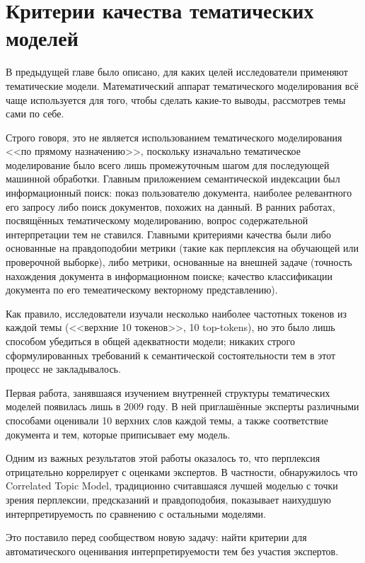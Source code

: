\chapter{Критерии качества тематических моделей}
\label{chap:metrics}


В предыдущей главе было описано, для каких целей исследователи применяют тематические модели. Математический аппарат тематического моделирования всё чаще используется для того, чтобы сделать какие-то выводы, рассмотрев темы сами по себе.

Строго говоря, это не является использованием тематического моделирования <<по прямому назначению>>, поскольку изначально тематическое моделирование было всего лишь промежуточным шагом для последующей машинной обработки. Главным приложением семантической индексации был информационный поиск: показ пользователю документа, наиболее релевантного его запросу либо поиск документов, похожих на данный. 
В ранних работах, посвящённых тематическому моделированию, вопрос содержательной интерпретации тем не ставился. Главными критериями качества были либо основанные на правдоподобии метрики (такие как перплексия на обучающей или проверочной выборке), либо метрики, основанные на внешней задаче (точность нахождения документа в информационном поиске; качество классификации документа по его темеатическому векторному представлению).

Как правило, исследователи изучали несколько наиболее частотных токенов из каждой темы (<<верхние 10 токенов>>, 10 top-tokens), но это было лишь способом убедиться в общей адекватности модели; никаких строго сформулированных требований к семантической состоятельности тем в этот процесс не закладывалось.

Первая работа, занявшаяся изучением внутренней структуры тематических моделей \cite{rtl} появилась лишь в 2009 году. В ней приглашённые эксперты различными способами оценивали 10 верхних слов каждой темы, а также соответствие документа и тем, которые приписывает ему модель. 

Одним из важных результатов этой работы оказалось то, что перплексия отрицательно коррелирует с оценками экспертов. В частности, обнаружилось что Correlated Topic Model, традиционно считавшаяся лучшей моделью с точки зрения перплексии, предсказаний и правдоподобия, показывает наихудшую интерпретируемость по сравнению с остальными моделями.

Это поставило перед сообществом новую задачу: найти критерии для автоматического оценивания интерпретируемости тем без участия экспертов. 

